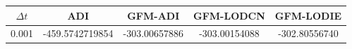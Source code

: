 \begin{table}[!t]
\centering
\begin{tabular}{c c c c c }
\hline
$\Delta t$  & ADI  & GFM-ADI       & GFM-LODCN     & GFM-LODIE     \\ \hline
0.001 & -459.5742719854 & -303.00657886  & -303.00154088   & -302.80556740 \\

\end{tabular}
\end{table}
